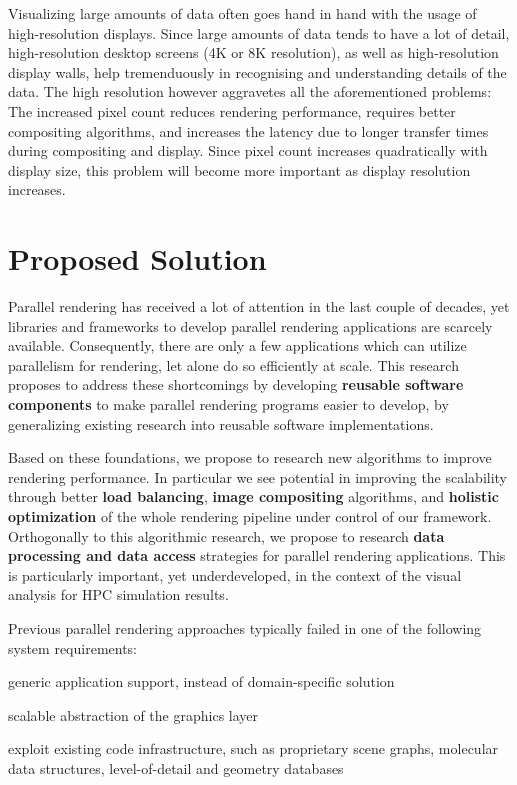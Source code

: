 Visualizing large amounts of data often goes hand in hand with the usage of
high-resolution displays. Since large amounts of data tends to have a lot of
detail, high-resolution desktop screens (4K or 8K resolution), as well as
high-resolution display walls, help tremenduously in recognising and
understanding details of the data. The high resolution however aggravetes all
the aforementioned problems: The increased pixel count reduces rendering
performance, requires better compositing algorithms, and increases the latency
due to longer transfer times during compositing and display. Since pixel count
increases quadratically with display size, this problem will become more
important as display resolution increases.

\section{Proposed Solution} %

Parallel rendering has received a lot of attention in the last couple of
decades, yet libraries and frameworks to develop parallel rendering applications
are scarcely available. Consequently, there are only a few applications which
can utilize parallelism for rendering, let alone do so efficiently at scale.
This research proposes to address these shortcomings by developing {\bf reusable
software components} to make parallel rendering programs easier to develop, by
generalizing existing research into reusable software implementations.

Based on these foundations, we propose to research new algorithms to improve
rendering performance. In particular we see potential in improving the
scalability through better {\bf load balancing}, {\bf image compositing}
algorithms, and {\bf holistic optimization} of the whole rendering pipeline
under control of our framework. Orthogonally to this algorithmic research, we
propose to research {\bf data processing and data access} strategies for
parallel rendering applications. This is particularly important, yet
underdeveloped, in the context of the visual analysis for HPC simulation
results.

Previous parallel rendering approaches typically failed in one of the following
system requirements:
%
\begin{compactenum}
\item generic application support, instead of domain-specific solution
\item scalable abstraction of the graphics layer
\item exploit existing code infrastructure, such as proprietary scene graphs, molecular data structures, level-of-detail and geometry databases
\end{compactenum}

